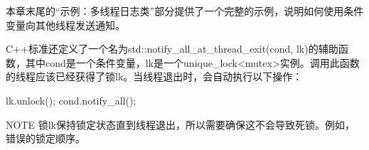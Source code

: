 本章末尾的“示例：多线程日志类”部分提供了一个完整的示例，说明如何使用条件变量向其他线程发送通知。

C++标准还定义了一个名为std::notify\_all\_at\_thread\_exit(cond, lk)的辅助函数，其中cond是一个条件变量，lk是一个unique\_lock<mutex>实例。调用此函数的线程应该已经获得了锁lk。当线程退出时，会自动执行以下操作：

\begin{cpp}
lk.unlock();
cond.notify_all();
\end{cpp}

\begin{myNotic}{NOTE}
锁lk保持锁定状态直到线程退出，所以需要确保这不会导致死锁。例如，错误的锁定顺序。
\end{myNotic}




